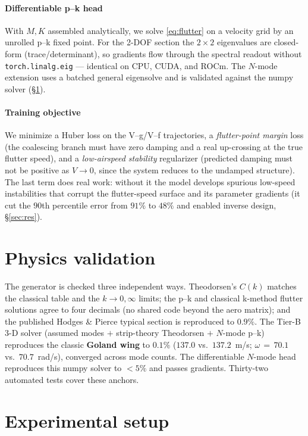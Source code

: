 \documentclass{article}
\begin{document}
\paragraph{Differentiable p--k head} With $M,K$ assembled analytically, we solve
\eqref{eq:flutter} on a velocity grid by an unrolled p--k fixed point. For the
2-DOF section the $2\times2$ eigenvalues are closed-form (trace/determinant), so
gradients flow through the spectral readout without \texttt{torch.linalg.eig} ---
identical on CPU, CUDA, and ROCm. The $N$-mode extension uses a batched general
eigensolve and is validated against the numpy solver (\S\ref{sec:phys}).

\paragraph{Training objective} We minimize a Huber loss on the V--g/V--f
trajectories, a \emph{flutter-point margin} loss (the coalescing branch must have
zero damping and a real up-crossing at the true flutter speed), and a
\emph{low-airspeed stability} regularizer (predicted damping must not be positive
as $V\!\to\!0$, since the system reduces to the undamped structure). The last term
does real work: without it the model develops spurious low-speed instabilities that
corrupt the flutter-speed surface and its parameter gradients (it cut the $90$th
percentile error from $91\%$ to $48\%$ and enabled inverse design, \S\ref{sec:res}).

\section{Physics validation}\label{sec:phys}
The generator is checked three independent ways. Theodorsen's $C(k)$ matches the
classical table and the $k\!\to\!0,\infty$ limits; the p--k and classical k-method
flutter solutions agree to four decimals (no shared code beyond the aero matrix);
and the published Hodges \& Pierce typical section is reproduced to $\mathbf{0.9\%}$.
The Tier-B 3-D solver (assumed modes $+$ strip-theory Theodorsen $+$ $N$-mode p--k)
reproduces the classic \textbf{Goland wing} to $\mathbf{0.1\%}$ ($137.0$ vs.\
$137.2$~m/s; $\omega\,{=}\,70.1$ vs.\ $70.7$~rad/s), converged across mode counts.
The differentiable $N$-mode head reproduces this numpy solver to $<\!5\%$ and
passes gradients. Thirty-two automated tests cover these anchors.

\section{Experimental setup}\label{sec:setup}
\end{document}

